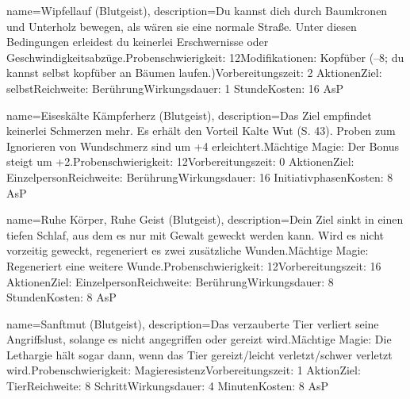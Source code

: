{
    name={Wipfellauf (Blutgeist)},
    description={Du kannst dich durch Baumkronen und Unterholz bewegen, als wären sie eine normale Straße. Unter diesen Bedingungen erleidest du keinerlei Erschwernisse oder Geschwindigkeitsabzüge.\newline Probenschwierigkeit: 12\newline Modifikationen: Kopfüber (–8; du kannst selbst kopfüber an Bäumen laufen.)\newline Vorbereitungszeit: 2 Aktionen\newline Ziel: selbst\newline Reichweite: Berührung\newline Wirkungsdauer: 1 Stunde\newline Kosten: 16 AsP}
}


{
    name={Eiseskälte Kämpferherz (Blutgeist)},
    description={Das Ziel empfindet keinerlei Schmerzen mehr. Es erhält den Vorteil Kalte Wut (S. 43). Proben zum Ignorieren von Wundschmerz sind um +4 erleichtert.\newline Mächtige Magie: Der Bonus steigt um +2.\newline Probenschwierigkeit: 12\newline Vorbereitungszeit: 0 Aktionen\newline Ziel: Einzelperson\newline Reichweite: Berührung\newline Wirkungsdauer: 16 Initiativphasen\newline Kosten: 8 AsP}
}


{
    name={Ruhe Körper, Ruhe Geist (Blutgeist)},
    description={Dein Ziel sinkt in einen tiefen Schlaf, aus dem es nur mit Gewalt geweckt werden kann. Wird es nicht vorzeitig geweckt, regeneriert es zwei zusätzliche Wunden.\newline Mächtige Magie: Regeneriert eine weitere Wunde.\newline Probenschwierigkeit: 12\newline Vorbereitungszeit: 16 Aktionen\newline Ziel: Einzelperson\newline Reichweite: Berührung\newline Wirkungsdauer: 8 Stunden\newline Kosten: 8 AsP}
}


{
    name={Sanftmut (Blutgeist)},
    description={Das verzauberte Tier verliert seine Angriffslust, solange es nicht angegriffen oder gereizt wird.\newline Mächtige Magie: Die Lethargie hält sogar dann, wenn das Tier gereizt/leicht verletzt/schwer verletzt wird.\newline Probenschwierigkeit: Magieresistenz\newline Vorbereitungszeit: 1 Aktion\newline Ziel: Tier\newline Reichweite: 8 Schritt\newline Wirkungsdauer: 4 Minuten\newline Kosten: 8 AsP}
}


